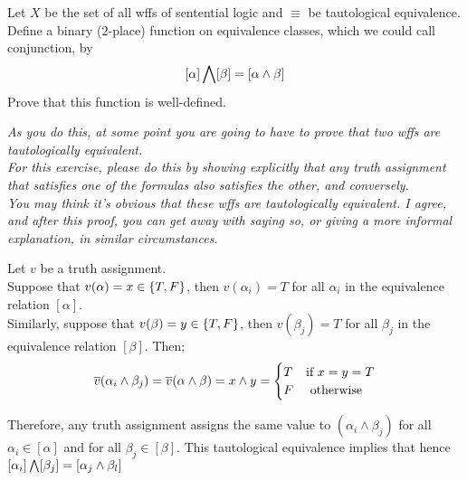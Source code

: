 \begin{problem}
  Let $X$ be the set of all wffs of sentential logic
  and $\equiv$ be tautological equivalence.
  Define a binary ($2$-place) function on equivalence classes,
  which we could call conjunction, by
  \[ [\alpha ] \bigwedge [\beta ] = [\alpha \land \beta ] \]
Prove that this function is well-defined.

\step
\emph{
  As you do this, at some point you are going to have to prove that two
  wffs are tautologically equivalent.\\
  For this exercise, please do this by showing
  explicitly that any truth assignment that satisfies one of the formulas also
  satisfies the other, and conversely.\\
  You may think it’s obvious that these wffs are tautologically equivalent.
  I agree, and after this proof, you can get away with saying so, or giving a
  more informal explanation, in similar circumstances.
}
\end{problem}
\begin{Answer}

  \step
  Let $v$ be a truth assignment.\\
  Suppose that $v(\alpha) = x \in \left\{T, F\right\}$, then $v(\alpha_i) = T$ for all $\alpha_i$ in the
  equivalence relation $[\alpha]$.\\
  Similarly, suppose that $v(\beta) = y \in \left\{T, F\right\}$, then $v(\beta_j) = T$ for all $\beta_j$ in the
  equivalence relation $[\beta]$.
  Then;
  \begin{align*}
    \overline{v}(\alpha_i \land \beta_j) = \overline{v}(\alpha \land \beta) = x \land y = \begin{cases}
      T & \text{if } x = y = T \\
      F & \text{ otherwise }
    \end{cases}
  \end{align*}

  \step
  Therefore, any truth assignment assigns the same value to
  $(\alpha_i \land \beta_j)$ for all $\alpha_i \in [\alpha]$ and for all $\beta_j \in [\beta]$.
  This tautological equivalence implies that 
  hence $[\alpha_i] \bigwedge [\beta_j] = [\alpha_j \land \beta_l]$

\end{Answer}
